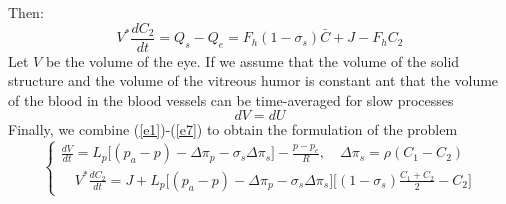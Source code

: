 \documentclass[english,12pt]{article}
\begin{document}
Then:
\begin{equation}
V^{\ast} \frac{dC_{2}}{dt}= Q_s-Q_e=F_h (1-\sigma_s) \bar{C}+J-F_h C_2
\label{e6}
\end{equation}
Let $V$ be the volume of the eye. If we assume that the volume of the solid structure and the volume of the vitreous humor is constant ant that the volume of the blood in the blood vessels can be time-averaged for slow processes
\begin{equation}
dV = dU
\label{e7}
\end{equation}
Finally, we combine (\ref{e1})-(\ref{e7}) to obtain the formulation of the problem
\begin{equation}\label{e8}
\left\{\begin{array}{ll}
\displaystyle{\frac{dV}{dt}}= L_p \big[ (p_a-p)-\Delta\pi_{p}-\sigma_{s} \Delta\pi_{s}\big]-\frac{p-p_{e}}{R},\quad \Delta\pi_{s}=\rho(C_1-C_{2})\\
\quad V^{\ast} \displaystyle{\frac{dC_{2}}{dt}}=J+L_p\big[  (p_a-p)- \Delta\pi_{p}-\sigma_{s} \Delta\pi_{s}\big] \big[(1-\sigma_s)\displaystyle{\frac{C_1+C_2}{2}-C_2\big]}
\end{array}\right.
\end{equation}
\end{document}
